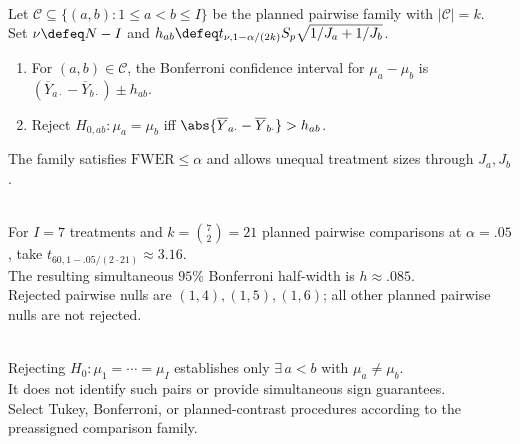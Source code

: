 \begin{method} \label{meth:bonferroni-multiple-mean-comparisons} \\
Let $\mathcal{C}\subseteq\{(a,b):1\leq a<b\leq I\}$ be the planned pairwise family with $|\mathcal{C}|=k$.\\
Set $\nu\defeq N-I$ and $h_{ab}\defeq t_{\nu,1-\alpha/(2k)}S_p\sqrt{1/J_a+1/J_b}$.
\begin{enumerate}[label=(\roman*)]
\setlength{\itemsep}{0pt}
\item For $(a,b)\in\mathcal{C}$, the Bonferroni confidence interval for $\mu_a-\mu_b$ is $(\overline{Y}_{a\cdot}-\overline{Y}_{b\cdot})\pm h_{ab}$.
\item Reject $H_{0,ab}:\mu_a=\mu_b$ iff $\abs{\overline{Y}_{a\cdot}-\overline{Y}_{b\cdot}}>h_{ab}$.
\end{enumerate}
The family satisfies $\mathrm{FWER}\leq\alpha$ and allows unequal treatment sizes through $J_a,J_b$.
\end{method}

\begin{example} \label{ex:bonferroni-pairwise-calculation} \\
For $I=7$ treatments and $k=\binom{7}{2}=21$ planned pairwise comparisons at $\alpha=.05$, take $t_{60,1-.05/(2\cdot21)}\approx3.16$.\\
The resulting simultaneous $95\%$ Bonferroni half-width is $h\approx.085$.\\
Rejected pairwise nulls are $(1,4),(1,5),(1,6)$; all other planned pairwise nulls are not rejected.
\end{example}

\begin{remark} \label{rem:multiple-comparisons-after-global-test} \\
Rejecting $H_0:\mu_1=\cdots=\mu_I$ establishes only $\exists\,a<b$ with $\mu_a\neq\mu_b$.\\
It does not identify such pairs or provide simultaneous sign guarantees.\\
Select Tukey, Bonferroni, or planned-contrast procedures according to the preassigned comparison family.
\end{remark}
